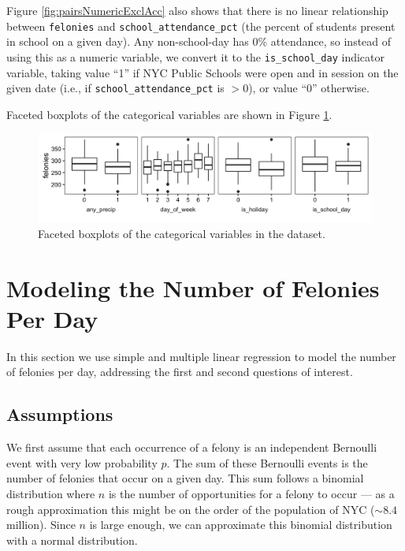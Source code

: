 \documentclass[11pt,notitlepage]{article}
\begin{document}
Figure \ref{fig:pairsNumericExclAcc} also shows that there is no linear relationship between \texttt{felonies} and \texttt{school_attendance_pct} (the percent of students present in school on a given day). Any non-school-day has 0\% attendance, so instead of using this as a numeric variable, we convert it to the \texttt{is_school_day} indicator variable, taking value ``1'' if NYC Public Schools were open and in session on the given date (i.e., if \texttt{school_attendance_pct} is $>0$), or value ``0'' otherwise.

Faceted boxplots of the categorical variables are shown in Figure \ref{fig:facetCategorical}.

\begin{figure}[!h]
	\centering
	\captionsetup{width=0.9\textwidth}
	\includegraphics[width=6in]{figures/facetCategorical.png}
	\vspace*{-5mm}
	\caption{Faceted boxplots of the categorical variables in the dataset.}
	\label{fig:facetCategorical}
	\vspace*{-3mm}
\end{figure}

\section{Modeling the Number of Felonies Per Day}
\label{sec:modelingFelonies}

In this section we use simple and multiple linear regression to model the number of felonies per day, addressing the first and second questions of interest.

\subsection{Assumptions}
\label{sec:feloniesAssumptions}

We first assume that each occurrence of a felony is an independent Bernoulli event with very low probability $p$. The sum of these Bernoulli events is the number of felonies that occur on a given day. This sum follows a binomial distribution where $n$ is the number of opportunities for a felony to occur --- as a rough approximation this might be on the order of the population of NYC ($\sim 8.4$ million). Since $n$ is large enough, we can approximate this binomial distribution with a normal distribution.
\end{document}
